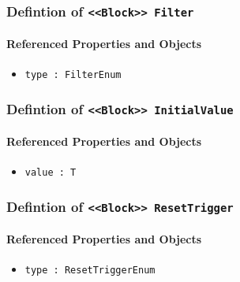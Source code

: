 \subsubsection{Defintion of \texttt{<<Block>> Filter}}
  \label{type:Filter}

\FloatBarrier



\FloatBarrier
\paragraph{Referenced Properties and Objects}

\begin{itemize}
\item \texttt{type : FilterEnum}

\end{itemize}
\FloatBarrier
\subsubsection{Defintion of \texttt{<<Block>> InitialValue}}
  \label{type:InitialValue}

\FloatBarrier



\FloatBarrier
\paragraph{Referenced Properties and Objects}

\begin{itemize}
\item \texttt{value : T}

\end{itemize}
\FloatBarrier
\subsubsection{Defintion of \texttt{<<Block>> ResetTrigger}}
  \label{type:ResetTrigger}

\FloatBarrier



\FloatBarrier
\paragraph{Referenced Properties and Objects}

\begin{itemize}
\item \texttt{type : ResetTriggerEnum}

\end{itemize}
\FloatBarrier

